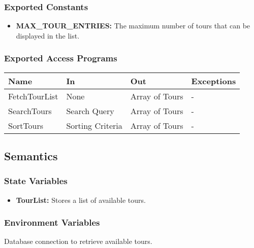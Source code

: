 \documentclass[12pt, titlepage]{article}
\begin{document}
\subsubsection{Exported Constants}

\begin{itemize}
  \item \textbf{MAX\_TOUR\_ENTRIES:} The maximum number of tours that can be displayed in the list.
\end{itemize}

\subsubsection{Exported Access Programs}

\begin{center}
  \begin{tabular}{p{4cm} p{4cm} p{4cm} p{4cm}}
    \hline
    \textbf{Name} & \textbf{In}      & \textbf{Out}   & \textbf{Exceptions} \\
    \hline
    FetchTourList & None             & Array of Tours & -                   \\
    \hline
    SearchTours   & Search Query     & Array of Tours & -                   \\
    \hline
    SortTours     & Sorting Criteria & Array of Tours & -                   \\
    \hline
  \end{tabular}
\end{center}

\subsection{Semantics}

\subsubsection{State Variables}

\begin{itemize}
  \item \textbf{TourList:} Stores a list of available tours.
\end{itemize}

\subsubsection{Environment Variables}

Database connection to retrieve available tours.
\end{document}
